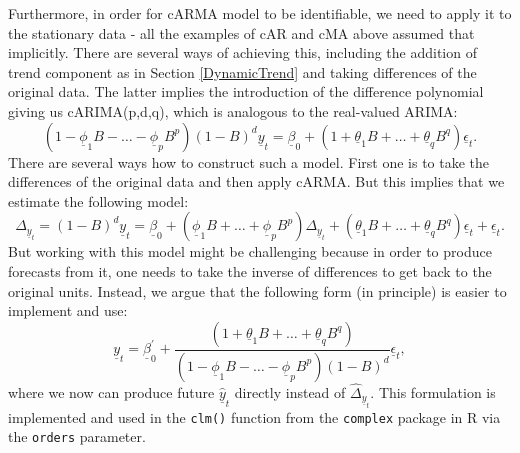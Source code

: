 \documentclass[
]{book}
\begin{document}
Furthermore, in order for cARMA model to be identifiable, we need to apply it to the stationary data - all the examples of cAR and cMA above assumed that implicitly. There are several ways of achieving this, including the addition of trend component as in Section \ref{DynamicTrend} and taking differences of the original data. The latter implies the introduction of the difference polynomial giving us cARIMA(p,d,q), which is analogous to the real-valued ARIMA:
\begin{equation}
    \left(1 - \underline{\phi}_1 B - \dots - \underline{\phi}_p B^p \right) \left(1 - B \right)^d \underline{y}_t  = \underline{\beta}_0 + \left(1 + \underline{\theta}_1 B + \dots + \underline{\theta}_q B^q \right) \underline{\epsilon}_t .
    \label{eq:ComplexARIMAPolynomial}
\end{equation}
There are several ways how to construct such a model. First one is to take the differences of the original data and then apply cARMA. But this implies that we estimate the following model:
\begin{equation}
    \Delta_{\underline{y}_t} = \left(1 - B \right)^d \underline{y}_t  = \underline{\beta}_0 + \left(\underline{\phi}_1 B + \dots + \underline{\phi}_p B^p \right) \Delta_{\underline{y}_t} + \left(\underline{\theta}_1 B + \dots + \underline{\theta}_q B^q \right) \underline{\epsilon}_t + \underline{\epsilon}_t .
    \label{eq:ComplexARIMADiffs}
\end{equation}
But working with this model might be challenging because in order to produce forecasts from it, one needs to take the inverse of differences to get back to the original units. Instead, we argue that the following form (in principle) is easier to implement and use:
\begin{equation}
    \underline{y}_t  = \underline{\beta}_0^\prime + \frac{\left(1 + \underline{\theta}_1 B + \dots + \underline{\theta}_q B^q \right)}{\left(1 - \underline{\phi}_1 B - \dots - \underline{\phi}_p B^p \right) \left(1 - B \right)^d} \underline{\epsilon}_t ,
    \label{eq:ComplexARIMADiffsCorrect}
\end{equation}
where we now can produce future \(\hat{\underline{y}}_t\) directly instead of \(\hat{\Delta}_{\underline{y}_t}\). This formulation is implemented and used in the \texttt{clm()} function from the \texttt{complex} package in R via the \texttt{orders} parameter.
\end{document}
